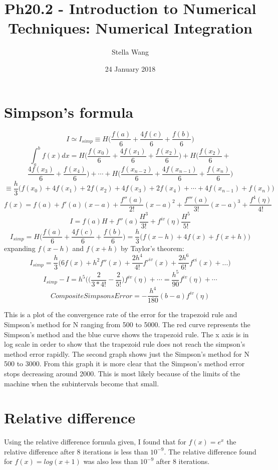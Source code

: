 \documentclass{article}
\title{Ph20.2 - Introduction to Numerical Techniques: Numerical Integration}
\author{Stella Wang}
\date{24 January 2018}
\begin{document}
	\maketitle
\section{Simpson's formula}

\[I \simeq I_{simp} \equiv H\bigg ( \frac{f(a)}{6} + \frac{4f(c)}{6} + \frac{f(b)}{6} \bigg) \]
 \[\int_a^b f(x)dx = H \Bigg( \frac{f(x_0)}{6} + \frac{4f(x_1)}{6}  + \frac{f(x_2)}{6} \Bigg) + H \Bigg( \frac{f(x_2)}{6} + \]
\[ \frac{4f(x_3)}{6}  + \frac{f(x_4)}{6} \Bigg) + \cdots + H \Bigg( \frac{f(x_{n-2})}{6} + \frac{4f(x_{n-1})}{6}  + \frac{f(x_n)}{6} \Bigg) \]
\[\equiv \frac{h}{3} \Bigg( f(x_0) +4f(x_1) + 2f(x_2) + 4f(x_3) + 2f(x_4) + \cdots + 4f(x_{n-1}) + f(x_n) \Bigg)  \]
\[f(x) = f(a) + f'(a)(x-a) + \frac {f''(a)}{2!}(x-a)^2 + \frac {f'''(a)}{3!}(x-a)^3+ \frac{f^4(\eta)}{4!}  \]
\[ I = f(a)H  + f''(a)\frac{H^3}{3!} + f^{iv}(\eta)\frac{H^5}{5!}  \]
\[I_{simp} = H\bigg ( \frac{f(a)}{6} + \frac{4f(c)}{6} + \frac{f(b)}{6} \bigg) = \frac{h}{3} \Bigg( f(x-h)+4f(x)+f(x+h) \Bigg)  \]
expanding $f(x-h)$ and $f(x+h)$ by Taylor's theorem: 
\[ I_{simp}= \frac{h}{3} \Bigg( 6f(x) + h^2f''(x) + \frac{2h^4}{4!}f'^{iv}(x)+ \frac{2h^6}{6!}f^{vi}(x)+... \Bigg)  \]
\[ I_{simp}-I= {h^5}\Bigg( \Big( \frac{2}{3*4!}-\frac{2}{5!} \Big) f^{iv}(\eta) +  \cdots  = \frac{h^5}{90}f^{iv}(\eta) + \cdots\]
\[ Composite Simpsons Error = - \frac{h^4}{180}(b-a)f^{iv}(\eta)\]

This is a plot of the convergence rate of the error for the trapezoid rule and Simpson's method for N ranging from 500 to 5000. The red curve represents the Simpson's method and the blue curve shows the trapezoid rule. The x axis is in log scale in order to show that the trapezoid rule does not reach the simpson's method error rapidly. The second graph shows just the Simpson's method for N 500 to 3000. From this graph it is more clear that the Simpson's method error stops decreasing around 2000. This is most likely because of the limits of the machine when the subintervals become that small. 


\section{Relative difference}
Using the relative  difference formula given, I found that for $f(x)= e^x$ the relative difference after 8 iterations is less than $10^{-9}$. The relative difference found for $f(x)=log(x+1)$ was also less than $10^{-9}$ after 8 iterations.
\end{document}
